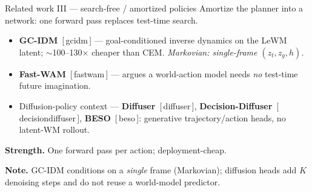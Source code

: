 \documentclass[aspectratio=169,10pt]{beamer}
\begin{document}
\begin{frame}{Related work III --- search-free / amortized policies}
\footnotesize
Amortize the planner into a network: one forward pass replaces test-time search.
\vspace{4pt}

\begin{itemize}\setlength\itemsep{4pt}
  \item \textbf{GC-IDM}~[\,gcidm\,] --- goal-conditioned inverse dynamics on the LeWM latent; $\sim$100--130$\times$ cheaper than CEM. \emph{Markovian: single-frame $(z_t, z_g, h)$.}
  \item \textbf{Fast-WAM}~[\,fastwam\,] --- argues a world-action model needs \emph{no} test-time future imagination.
  \item Diffusion-policy context --- \textbf{Diffuser}~[\,diffuser\,], \textbf{Decision-Diffuser}~[\,decisiondiffuser\,], \textbf{BESO}~[\,beso\,]: generative trajectory/action heads, no latent-WM rollout.
\end{itemize}

\vspace{6pt}
{\color{latent}\textbf{Strength.}} One forward pass per action; deployment-cheap.

\vspace{3pt}
{\color{black!75}\textbf{Note.}} GC-IDM conditions on a \emph{single} frame (Markovian); diffusion heads add $K$ denoising steps and do not reuse a world-model predictor.
\end{frame}
\end{document}
